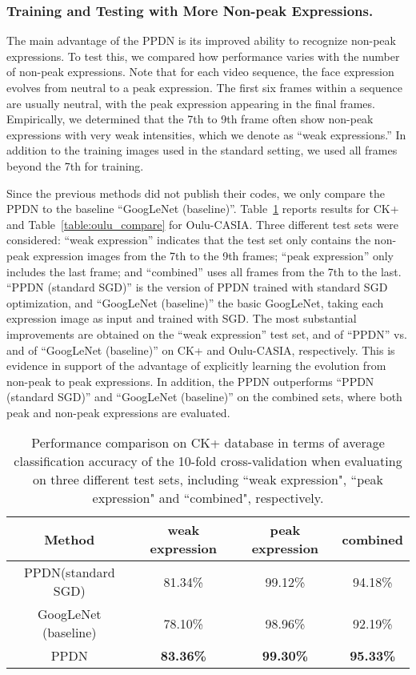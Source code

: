 \documentclass[runningheads]{llncs}
\begin{document}
\subsubsection{Training and Testing with More Non-peak Expressions.} 
The main advantage of the PPDN is its improved ability to
recognize non-peak expressions. To test this,
we compared how performance varies with the number of non-peak expressions. 
Note that for each video sequence, the face expression evolves from neutral 
to a peak expression. The first six frames within a sequence are usually
neutral, with the peak expression appearing in the final frames. 
Empirically, we determined that the 7th to 9th frame often show 
non-peak expressions with very weak intensities, which we
denote as ``weak expressions.'' In addition to the training images used
in the standard setting,  we used all frames beyond the 7th for training. 

Since the previous methods did not publish their codes, we only compare 
the PPDN to the baseline ``GoogLeNet (baseline)''.
Table~\ref{table:ck_compare} reports results for CK+ and 
Table~\ref{table:oulu_compare} for Oulu-CASIA. Three different test sets
were considered: ``weak expression'' indicates that the test set only 
contains the non-peak expression images from the 7th to the 9th frames;
``peak expression'' only includes the last frame; and ``combined'' 
uses all frames from the 7th to the last. ``PPDN (standard SGD)'' is the 
version of PPDN trained with standard SGD optimization, and 
``GoogLeNet (baseline)'' the basic GoogLeNet, taking each expression image 
as input and trained with SGD. The most substantial improvements 
are obtained on the ``weak expression'' test set,  and
 of ``PPDN'' vs.  and  of ``GoogLeNet (baseline)''
on CK+ and Oulu-CASIA, respectively. This is evidence in support
of the advantage of explicitly learning the evolution from non-peak 
to peak expressions. In addition, the PPDN outperforms ``PPDN (standard SGD)''
and ``GoogLeNet (baseline)'' on the combined sets, where both peak and 
non-peak expressions are evaluated. 

\begin{table}[!tp]\setlength{\tabcolsep}{0.5pt}
	\begin{center}
		\caption{Performance comparison on CK+ database in terms of average classification accuracy of the 10-fold cross-validation when evaluating on three different test sets, including ``weak expression", ``peak expression" and ``combined", respectively.}
		\label{table:ck_compare}
		\begin{tabular}{c|c|c|c}
			\hline\noalign{\smallskip}
			Method & weak expression & peak expression & combined\\
			\hline
			PPDN(standard SGD) & 81.34\% & 99.12\% & 94.18\%\\
			GoogLeNet (baseline)   & 78.10\% & 98.96\% & 92.19\%\\
			\hline
			PPDN & \textbf{83.36\%} & \textbf{99.30\%} & \textbf{95.33\%}\\
			\hline
		\end{tabular}
	\end{center}
\end{table}
\end{document}
